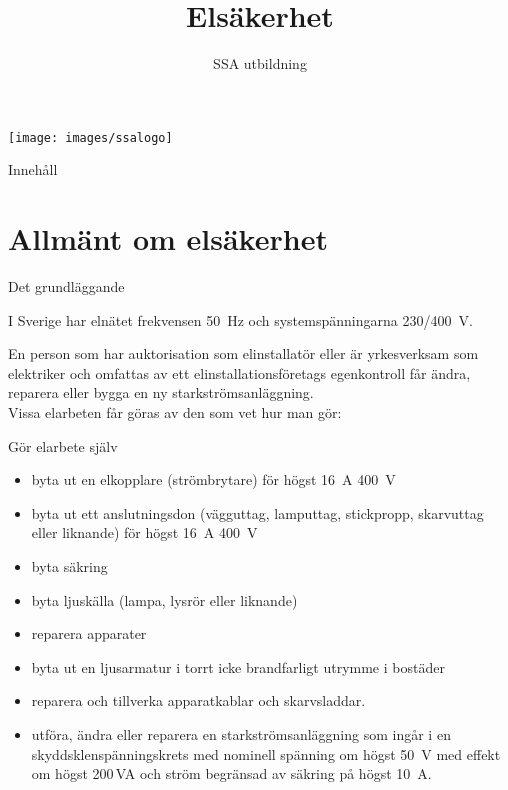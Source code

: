 \documentclass{beamer}
\title[SM7NTJ]{Elsäkerhet}
\author{SSA utbildning}
\begin{document}
	
	\begin{frame}
		\titlepage
		\texttt{[image: images/ssalogo]}
	\end{frame}

\begin{frame}{Innehåll}
\tableofcontents
\end{frame}

\section{Allmänt om elsäkerhet}

\begin{frame}{Det grundläggande}

I Sverige har elnätet frekvensen \SI{50}{\hertz} och systemspänningarna \SI{230/400}{\volt}.

En person som har auktorisation som elinstallatör eller är yrkesverksam som
elektriker och omfattas av ett elinstallationsföretags egenkontroll får ändra,
reparera eller bygga en ny starkströmsanläggning.\\
\vspace{5mm}
Vissa elarbeten får göras av den som vet hur man gör:
\end{frame}

\begin{frame}{Gör elarbete själv}
\begin{itemize}
	\item byta ut en elkopplare (strömbrytare) för högst \SI{16}{\ampere} \SI{400}{\volt}
	\item byta ut ett anslutningsdon (vägguttag, lamputtag, stickpropp,
	skarvuttag eller liknande) för högst \SI{16}{\ampere} \SI{400}{\volt}
	\item byta säkring
	\item byta ljuskälla (lampa, lysrör eller liknande)
	\item reparera apparater
	\item byta ut en ljusarmatur i torrt icke brandfarligt utrymme i bostäder
	\item reparera och tillverka apparatkablar och skarvsladdar.
	\item utföra, ändra eller reparera en starkströmsanläggning som ingår i en
	skyddsklenspänningskrets med nominell spänning om högst \SI{50}{\volt} med effekt
	om högst 200\,VA och ström begränsad av säkring på högst \SI{10}{\ampere}.
\end{itemize}
\end{frame}
\end{document}
